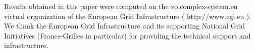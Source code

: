 \documentclass{bmcart}
\providecommand{\DIFaddbegin}{} %
\providecommand{\DIFaddend}{} %
\newcommand{\DIFaddincludegraphics}[2][]{{\color{blue}\fbox{\DIFOincludegraphics[#1]{#2}}}} %
\DeclareRobustCommand{\DIFaddbegin}{\DIFOaddbegin \let\includegraphics\DIFaddincludegraphics} %
\DeclareRobustCommand{\DIFaddend}{\DIFOaddend \let\includegraphics\DIFOincludegraphics} %
\begin{document}
\begin{backmatter}
Results obtained in this paper were computed on the vo.complex-system.eu virtual organization of the European Grid Infrastructure ( http://www.egi.eu ). We thank the European Grid Infrastructure and its supporting National Grid Initiatives (France-Grilles in particular) for providing the technical support and infrastructure.
\DIFaddbegin 


 \vspace{-0.2cm}
  \DIFaddend 





\end{backmatter}
\end{document}

